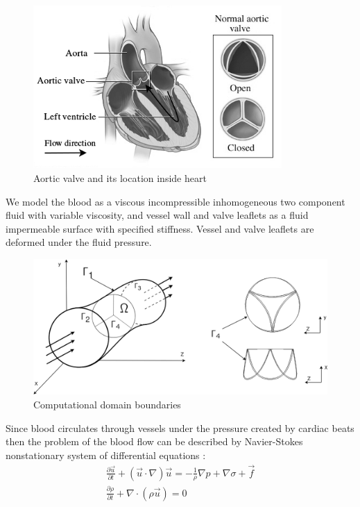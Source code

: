 \documentclass[runningheads,a4paper]{llncs}
\begin{document}
\begin{figure}
\centering
\includegraphics[height=6.2cm]{images/aorta_scheme_gray.png}
\caption{Aortic valve and its location inside heart}
\label{fig:aortic_valve_example}
\end{figure}

We model the blood as a viscous incompressible inhomogeneous two component fluid with variable viscosity, and vessel wall and valve leaflets as a
fluid impermeable surface with specified stiffness. Vessel and valve leaflets are deformed under the fluid pressure.

\begin{figure}
\centering
\includegraphics[width=12.5cm]{images/area_3d.png}
\caption{Computational domain boundaries}
\label{fig:area_3d}
\end{figure}

Since blood circulates through vessels under the pressure created by cardiac beats then the problem of the blood flow
can be described by Navier-Stokes nonstationary system of differential equations \cite{gummel}:
\begin{gather}
    \label{eq:navier_stokes:motion}
    \frac{\partial \vec{u}}{\partial t} + (\vec{u} \cdot \nabla) \vec{u} = - \frac{1}{\rho} \nabla p + \nabla \sigma + \vec{f}\\
    \label{eq:navier_stokes:continuity}
    \frac{\partial \rho}{\partial t} + \nabla \cdot (\rho \vec{u}) = 0 
\end{gather}
\end{document}

